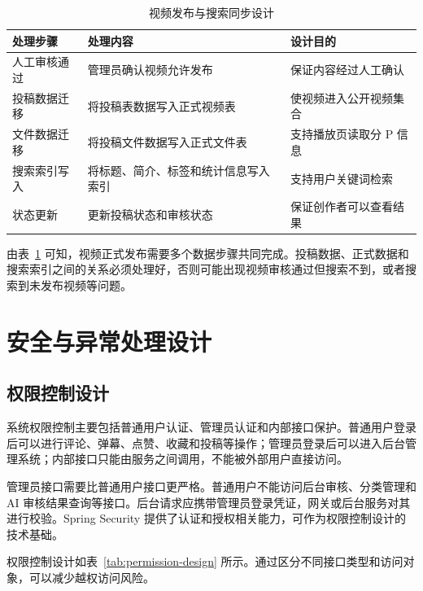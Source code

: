 \begin{table}[htbp]
  \centering
  \caption{视频发布与搜索同步设计}
  \label{tab:publish-sync-design}
  \begin{tabular}{p{}p{}p{}}
    \hline
    \textbf{处理步骤} & \textbf{处理内容} & \textbf{设计目的} \\
    \hline
    人工审核通过 & 管理员确认视频允许发布 & 保证内容经过人工确认 \\
    投稿数据迁移 & 将投稿表数据写入正式视频表 & 使视频进入公开视频集合 \\
    文件数据迁移 & 将投稿文件数据写入正式文件表 & 支持播放页读取分 P 信息 \\
    搜索索引写入 & 将标题、简介、标签和统计信息写入索引 & 支持用户关键词检索 \\
    状态更新 & 更新投稿状态和审核状态 & 保证创作者可以查看结果 \\
    \hline
  \end{tabular}
\end{table}

由表~\ref{tab:publish-sync-design} 可知，视频正式发布需要多个数据步骤共同完成。投稿数据、正式数据和搜索索引之间的关系必须处理好，否则可能出现视频审核通过但搜索不到，或者搜索到未发布视频等问题。

\section{安全与异常处理设计}
\label{sec:security-exception-design}

\subsection{权限控制设计}
\label{subsec:permission-control-design}

系统权限控制主要包括普通用户认证、管理员认证和内部接口保护。普通用户登录后可以进行评论、弹幕、点赞、收藏和投稿等操作；管理员登录后可以进入后台管理系统；内部接口只能由服务之间调用，不能被外部用户直接访问。

管理员接口需要比普通用户接口更严格。普通用户不能访问后台审核、分类管理和 AI 审核结果查询等接口。后台请求应携带管理员登录凭证，网关或后台服务对其进行校验。Spring Security 提供了认证和授权相关能力，可作为权限控制设计的技术基础\cite{springsecuritydocs}。

权限控制设计如表~\ref{tab:permission-design} 所示。通过区分不同接口类型和访问对象，可以减少越权访问风险。

